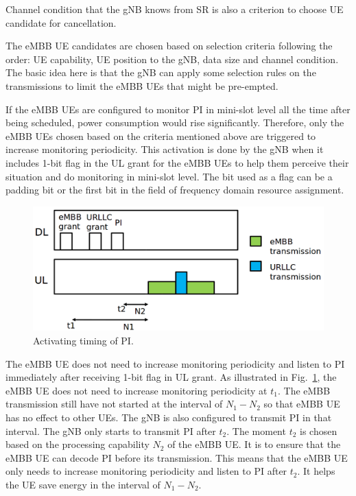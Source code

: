 \documentclass{ieeeaccess}
\begin{document}
Channel condition that the gNB knows from SR is also a criterion to choose UE candidate for cancellation.

The eMBB UE candidates are chosen based on selection criteria following the order: UE capability, UE position to the gNB, data size and channel condition. The basic idea here is that the gNB can apply some selection rules on the transmissions to limit the eMBB UEs that might be pre-empted.

If the eMBB UEs are configured to monitor PI in mini-slot level all the time after being scheduled, power consumption would rise significantly. Therefore, only the eMBB UEs chosen based on the criteria mentioned above are triggered to increase monitoring periodicity. This activation is done by the gNB when it includes 1-bit flag in the UL grant for the eMBB UEs to help them perceive their situation and do monitoring in mini-slot level. The bit used as a flag can be a padding bit or the first bit in the field of frequency domain resource assignment.

\begin{figure}[htbp]
\centerline{\includegraphics[scale=0.2]{fig17.png}}
\caption{Activating timing of PI.}
\label{fig17}
\end{figure}

The eMBB UE does not need to increase monitoring periodicity and listen to PI immediately after receiving 1-bit flag in UL grant. As illustrated in Fig.~\ref{fig17}, the eMBB UE does not need to increase monitoring periodicity at $t_1$. The eMBB transmission still have not started at the interval of $N_1-N_2$ so that eMBB UE has no effect to other UEs. The gNB is also configured to transmit PI in that interval. The gNB only starts to transmit PI after $t_2$. The moment $t_2$ is chosen based on the processing capability $N_2$ of the eMBB UE. It is to ensure that the eMBB UE can decode PI before its transmission. This means that the eMBB UE only needs to increase monitoring periodicity and listen to PI after $t_2$. It helps the UE save energy in the interval of $N_1-N_2$.
\end{document}
